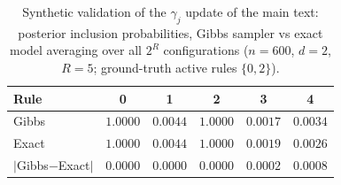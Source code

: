 \documentclass[review,1p,times]{elsarticle}
\begin{document}
\begin{table}[htbp]
\centering
\caption{Synthetic validation of the $\gamma_j$ update of the main text: posterior inclusion probabilities, Gibbs sampler vs exact model averaging over all $2^R$ configurations ($n=600$, $d=2$, $R=5$; ground-truth active rules $\{0,2\}$).}
\label{tab:synthetic}
\footnotesize
\begin{tabular}{lccccc}
\toprule
Rule & 0 & 1 & 2 & 3 & 4 \\
\midrule
Gibbs & $1.0000$ & $0.0044$ & $1.0000$ & $0.0017$ & $0.0034$ \\
Exact & $1.0000$ & $0.0044$ & $1.0000$ & $0.0019$ & $0.0026$ \\
\midrule
$|$Gibbs$-$Exact$|$ & $0.0000$ & $0.0000$ & $0.0000$ & $0.0002$ & $0.0008$ \\
\bottomrule
\end{tabular}
\end{table}

\FloatBarrier
\end{document}
